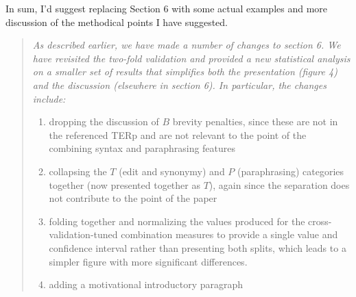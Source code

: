 \documentclass[letterpaper,12pt]{article}
\newenvironment{response}
{\begin{quotation} \it}
  {\end{quotation}}
\begin{document}
In sum, I'd suggest replacing Section 6 with some actual examples and
more discussion of the methodical points I have suggested.
\begin{response}
  As described earlier, we have made a number of changes to section 6.  We have
  revisited the two-fold validation and provided a new statistical
  analysis on a smaller set of results that simplifies both the presentation (figure 4) and the
  discussion (elsewhere in section 6). In particular, the changes
  include:
  \begin{enumerate}
  \item dropping the discussion of $B$ brevity penalties, since these are not in the  referenced TERp and are not relevant to the point of the combining
    syntax and paraphrasing features
  \item collapsing the $T$ (edit and synonymy) and $P$ (paraphrasing)
    categories together (now presented together as $T$), again since the
    separation does not contribute to the point of the paper
  \item folding together and normalizing the values produced for the
    cross-validation-tuned combination measures to provide a single value and
    confidence interval rather than presenting both splits, which leads to a simpler 
    figure with more significant differences.
  \item adding a motivational introductory paragraph
  \end{enumerate}
\end{response}
\end{document}

